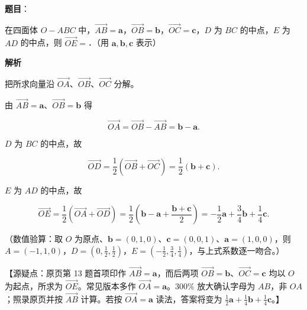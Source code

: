 \begin{answer}

\textbf{题目}：

在四面体 $O-ABC$ 中，$\overrightarrow{AB}=\boldsymbol a$，$\overrightarrow{OB}=\boldsymbol b$，$\overrightarrow{OC}=\boldsymbol c$，$D$ 为 $BC$ 的中点，$E$ 为 $AD$ 的中点，则 $\overrightarrow{OE}=$\gkblank{}．（用 $\boldsymbol a,\boldsymbol b,\boldsymbol c$ 表示）

\textbf{解析}

把所求向量沿 $\overrightarrow{OA}$、$\overrightarrow{OB}$、$\overrightarrow{OC}$ 分解。

由 $\overrightarrow{AB}=\boldsymbol a$、$\overrightarrow{OB}=\boldsymbol b$ 得

\nopagebreak[4]
\[\overrightarrow{OA}=\overrightarrow{OB}-\overrightarrow{AB}=\boldsymbol b-\boldsymbol a.\]

$D$ 为 $BC$ 的中点，故

\nopagebreak[4]
\[\overrightarrow{OD}=\frac12\left(\overrightarrow{OB}+\overrightarrow{OC}\right)=\frac12(\boldsymbol b+\boldsymbol c).\]

$E$ 为 $AD$ 的中点，故

\nopagebreak[4]
\[\overrightarrow{OE}=\frac12\left(\overrightarrow{OA}+\overrightarrow{OD}\right)=\frac12\left(\boldsymbol b-\boldsymbol a+\frac{\boldsymbol b+\boldsymbol c}{2}\right)=-\frac12\boldsymbol a+\frac34\boldsymbol b+\frac14\boldsymbol c.\]

（数值验算：取 $O$ 为原点、$\boldsymbol b=(0,1,0)$、$\boldsymbol c=(0,0,1)$、$\boldsymbol a=(1,0,0)$，则 $A=(-1,1,0)$，$D=\left(0,\frac12,\frac12\right)$，$E=\left(-\frac12,\frac34,\frac14\right)$，与上式系数逐一吻合。）

【源疑点：原页第 13 题首项印作 $\overrightarrow{AB}=\boldsymbol a$，而后两项 $\overrightarrow{OB}=\boldsymbol b$、$\overrightarrow{OC}=\boldsymbol c$ 均以 $O$ 为起点，所求为 $\overrightarrow{OE}$。常见版本多作 $\overrightarrow{OA}=\boldsymbol a$。300\% 放大确认字母为 $AB$，非 $OA$；照录原页并按 $\overrightarrow{AB}$ 计算。若按 $\overrightarrow{OA}=\boldsymbol a$ 读法，答案将变为 $\frac12\boldsymbol a+\frac14\boldsymbol b+\frac14\boldsymbol c$。】


\end{answer}
